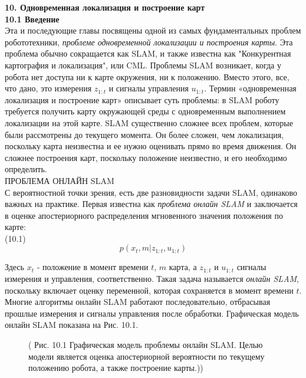 \documentclass[10pt,a4paper]{article}
\begin{document}
\textbf{10. Одновременная локализация и построение карт}\\

\textbf{10.1	Введение}\\

Эта и последующие главы посвящены одной из самых фундаментальных проблем робототехники, \textit{проблеме одновременной локализации и построения карты}. Эта проблема обычно сокращается как SLAM, и также известна как "Конкурентная картография и локализация", или CML. Проблемы SLAM возникает, когда у робота нет доступа ни к карте окружения, ни к положению. Вместо этого, все, что дано, это измерения $z_{1:t}$ и сигналы управления $u_{1:t}$. Термин «одновременная локализация и построение карт» описывает суть проблемы: в SLAM роботу требуется получить карту окружающей среды с одновременным выполнением локализации на этой карте. SLAM существенно сложнее всех проблем, которые были рассмотрены до текущего момента. Он более сложен, чем локализация, поскольку карта неизвестна и ее нужно оценивать прямо во время движения. Он сложнее построения карт, поскольку положение неизвестно, и его необходимо определить.\\

ПРОБЛЕМА ОНЛАЙН SLAM\\

С вероятностной точки зрения, есть две разновидности задачи SLAM, одинаково важных на практике. Первая известна как \textit{проблема онлайн SLAM} и заключается в оценке апостериорного распределения мгновенного значения положения по карте:\\

(10.1)
$$p(x_t,m|z_{1:t},u_{1:t})$$

Здесь $x_t$ - положение в момент времени $t$, $m$ карта, а $z_{1:t}$ и $u_{1:t}$ сигналы измерения и управления, соответственно. Такая задача называется \textit{онлайн SLAM}, поскольку включает оценку переменной, которая сохраняется в момент времени $t$. Многие алгоритмы онлайн SLAM работают последовательно, отбрасывая прошлые измерения и сигналы управления после обработки. Графическая модель онлайн SLAM показана на Рис. 10.1.

\begin{figure}[H]
	\caption{ ( Рис. 10.1 Графическая модель проблемы онлайн SLAM. Целью модели является оценка апостериорной вероятности по текущему положению робота, а также построение карты.))}
	\label{fig:101orig}
\end{figure}
\end{document}
